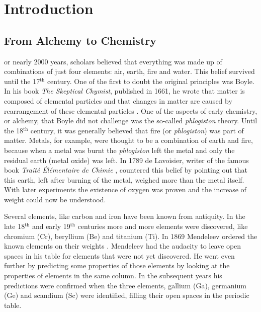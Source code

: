\chapter{Introduction}
\label{chap_intro}

\newpage

\section{From Alchemy to Chemistry}

\lettrine{}{}or nearly 2000 years, scholars believed that everything was made up of combinations of just four elements: air, earth, fire and water. This belief survived until the 17$^\mathrm{th}$ century. One of the first to doubt the original principles was Boyle. In his book \textit{The Skeptical Chymist}, published in 1661, he wrote that matter is composed of elemental particles and that changes in matter are caused by rearrangement of these elemental particles \cite{boyle}. One of the aspects of early chemistry, or alchemy, that Boyle did not challenge was the so-called \textit{phlogiston} theory. Until the 18$^\mathrm{th}$ century, it was generally believed that fire (or \textit{phlogiston}) was part of matter. Metals, for example, were thought to be a combination of earth and fire, because when a metal was burnt the \textit{phlogiston} left the metal and only the residual earth (metal oxide) was left. In 1789 de Lavoisier, writer of the famous book \textit{Trait\'e \'El\'ementaire de Chimie} \cite{lavoisier}, countered this belief by pointing out that this earth, left after burning of the metal, weighed more than the metal itself. With later experiments the existence of oxygen was proven and the increase of weight could now be understood.

Several elements, like carbon and iron have been known from antiquity. In the late 18$^\mathrm{th}$ and early 19$^\mathrm{th}$ centuries more and more elements were discovered, like chromium (Cr), beryllium (Be) and titanium (Ti).  In 1869 Mendeleev ordered the known elements on their weights \cite{mendeleev}. Mendeleev had the audacity to leave open spaces in his table for elements that were not yet discovered. He went even further by predicting some properties of those elements by looking at the properties of elements in the same column. In the subsequent years his predictions were confirmed when the three elements, gallium (Ga), germanium (Ge) and scandium (Sc) were identified, filling their open spaces in the periodic table.

